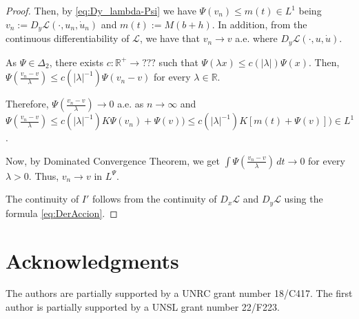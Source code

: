 \documentclass[twoside]{article}
\theoremstyle{remark}
\newcommand{\rr}{\mathbb{R}}
\renewcommand{\leq}{\leqslant}
\begin{document}
\begin{proof}
Then, by \eqref{eq:Dy_lambda-Psi} we have
 $ \Psi(v_n) 
	\leq m(t) \in L^1$
 being  $v_n:=D_{y}\mathcal{L}(\cdot,u_n,\dot{u}_n)$ and $m(t):= M (b+h)$. 
In addition, from the continuous differentiability of $\mathcal{L}$, we have that
$v_n \to v$ a.e. where $D_y\mathcal{L}(\cdot,u,\dot{u})$.

As  $\Psi\in\Delta_2$, there exists $c:\rr^+\to ???$ such that 
$\Psi(\lambda x)\leq c(|\lambda|)\Psi(x)$. 
Then, $\Psi(\frac{v_n-v}{\lambda})\leq c(|\lambda|^{-1})\Psi(v_n-v)$ for every $\lambda \in \rr$.

Therefore, $\Psi(\frac{v_n-v}{\lambda})\to 0$ a.e. as $n \to \infty$ and 
$\Psi(\frac{v_n-v}{\lambda})\leq c(|\lambda|^{-1})K\Psi(v_n)+\Psi(v))
\leq c(|\lambda|^{-1}) K [m(t)+\Psi(v)])\in L^1$.

Now, by Dominated Convergence Theorem, we get
$
\int \Psi(\frac{v_n-v}{\lambda})\,dt \to 0
$
for every $\lambda>0$. Thus, $v_n \to v$ in $L^{\Psi}$.

The continuity of $I'$  follows  from the continuity 
of $D_{x}\mathcal{L}$ and $D_{y}\mathcal{L}$ using the formula \eqref{eq:DerAccion}.
\end{proof}







\section*{Acknowledgments}
The authors are partially supported by a UNRC grant number 18/C417. The first author is  partially supported by a  UNSL grant number 22/F223. 




% 
 
 

\end{document}
